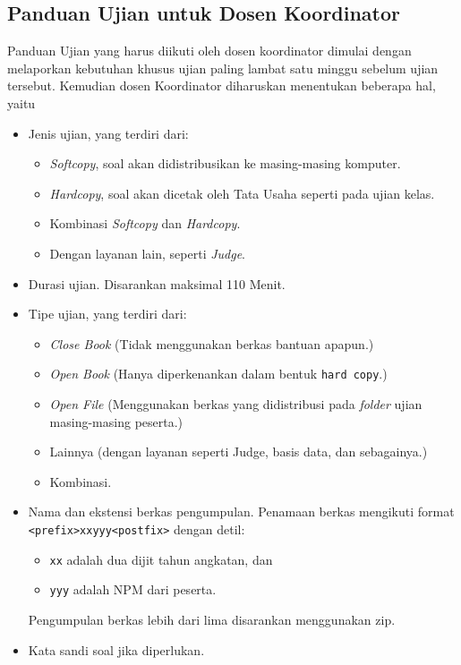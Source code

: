 \subsection{Panduan Ujian untuk Dosen Koordinator}
    Panduan Ujian yang harus diikuti oleh dosen koordinator dimulai dengan
    melaporkan kebutuhan khusus ujian paling lambat satu minggu sebelum ujian
    tersebut.  Kemudian dosen Koordinator diharuskan menentukan beberapa hal,
    yaitu
    \begin{itemize}
        \item Jenis ujian, yang terdiri dari: 
            \begin{itemize}
                \item \textit{Softcopy}, soal akan didistribusikan ke
                    masing-masing komputer.
                \item \textit{Hardcopy}, soal akan dicetak oleh Tata Usaha seperti pada
                    ujian kelas.
                \item Kombinasi \textit{Softcopy} dan \textit{Hardcopy}.
                \item Dengan layanan lain, seperti \textit{Judge}.
            \end{itemize}
        \item Durasi ujian. Disarankan maksimal 110 Menit.
        \item Tipe ujian, yang terdiri dari:
            \begin{itemize}
                \item \textit{Close Book} (Tidak menggunakan berkas bantuan apapun.)
                \item \textit{Open Book} (Hanya diperkenankan dalam bentuk
                    \texttt{hard copy}.)
                \item \textit{Open File} (Menggunakan berkas yang didistribusi
                    pada \textit{folder} ujian masing-masing peserta.)
                \item Lainnya (dengan layanan seperti Judge, basis data, dan sebagainya.)
                \item Kombinasi.
            \end{itemize}
        \item Nama dan ekstensi berkas pengumpulan. Penamaan berkas mengikuti
            format  \\
            \texttt{<prefix>xxyyy<postfix>} dengan detil:
            \begin{itemize}
                \item \texttt{xx} adalah dua dijit tahun angkatan, dan
                \item \texttt{yyy} adalah NPM dari peserta.
            \end{itemize}
            Pengumpulan berkas lebih dari lima disarankan menggunakan zip.

        \item Kata sandi soal jika diperlukan.
    \end{itemize}

